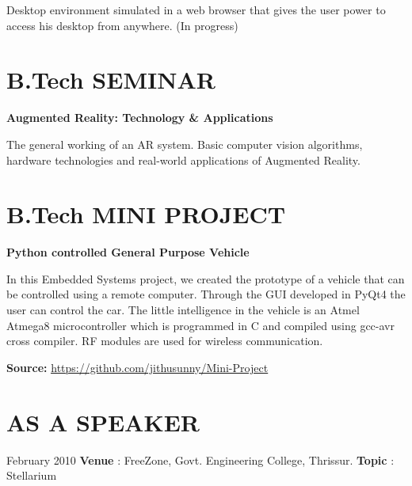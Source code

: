 \begin{resume}
\begin{list1}
\item[] Desktop environment simulated in a web browser that gives the user power to access his desktop from anywhere. \qquad (In progress)
\end{list1}

\vspace*{+3.5mm}

\section{\sc \bf \textsf{B.Tech \qquad SEMINAR}}
{\bf \textsf{Augmented Reality: Technology \& Applications}}\\
\vspace*{-.1in}

\begin{list1}
\item[] The general working of an AR system. Basic computer vision algorithms, hardware technologies and real-world applications of Augmented Reality.
\end{list1}

\vspace*{+3.5mm}

\section{\sc \bf \textsf{B.Tech MINI PROJECT}}
{\bf \textsf{Python controlled General Purpose Vehicle}}\\
\vspace*{-.1in}

\begin{list1}
\item[] In this Embedded Systems project, we created the prototype of a vehicle that can be controlled using a remote computer. Through the GUI developed in PyQt4 the user can control the car. The little intelligence in the vehicle is an Atmel Atmega8 microcontroller which is programmed in C and compiled using gcc-avr cross compiler. RF modules are used for wireless communication.
\\
\item[] \textbf{Source:} \href{https://github.com/jithusunny/Mini-Project}{\underline{https://github.com/jithusunny/Mini-Project}}
\end{list1}

\vspace*{+2mm}

\section{\sc \bf \textsf{AS A SPEAKER}}
February 2010 \textbf{Venue} : FreeZone, Govt. Engineering College, Thrissur. \textbf{Topic} : Stellarium


\end{resume}
